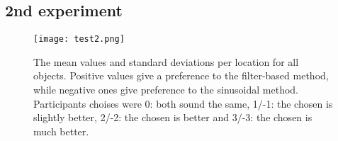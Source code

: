 \subsection{2nd experiment}

\begin{figure}[H]
  \centering
    \texttt{[image: test2.png]}
      \caption{The mean values and standard deviations per location for all objects. Positive values give a preference to the filter-based method, while negative ones give preference to the sinusoidal method. Participants choises were 0: both sound the same, 1/-1: the chosen is slightly better, 2/-2: the chosen is better and 3/-3: the chosen is much better.}\label{fig:means}
\end{figure}